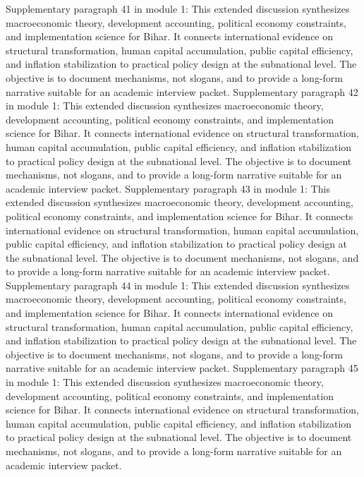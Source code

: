 \documentclass[preprint,12pt]{elsarticle}
\begin{document}
Supplementary paragraph 41 in module 1: This extended discussion synthesizes macroeconomic theory, development accounting, political economy constraints, and implementation science for Bihar. It connects international evidence on structural transformation, human capital accumulation, public capital efficiency, and inflation stabilization to practical policy design at the subnational level. The objective is to document mechanisms, not slogans, and to provide a long-form narrative suitable for an academic interview packet.
Supplementary paragraph 42 in module 1: This extended discussion synthesizes macroeconomic theory, development accounting, political economy constraints, and implementation science for Bihar. It connects international evidence on structural transformation, human capital accumulation, public capital efficiency, and inflation stabilization to practical policy design at the subnational level. The objective is to document mechanisms, not slogans, and to provide a long-form narrative suitable for an academic interview packet.
Supplementary paragraph 43 in module 1: This extended discussion synthesizes macroeconomic theory, development accounting, political economy constraints, and implementation science for Bihar. It connects international evidence on structural transformation, human capital accumulation, public capital efficiency, and inflation stabilization to practical policy design at the subnational level. The objective is to document mechanisms, not slogans, and to provide a long-form narrative suitable for an academic interview packet.
Supplementary paragraph 44 in module 1: This extended discussion synthesizes macroeconomic theory, development accounting, political economy constraints, and implementation science for Bihar. It connects international evidence on structural transformation, human capital accumulation, public capital efficiency, and inflation stabilization to practical policy design at the subnational level. The objective is to document mechanisms, not slogans, and to provide a long-form narrative suitable for an academic interview packet.
Supplementary paragraph 45 in module 1: This extended discussion synthesizes macroeconomic theory, development accounting, political economy constraints, and implementation science for Bihar. It connects international evidence on structural transformation, human capital accumulation, public capital efficiency, and inflation stabilization to practical policy design at the subnational level. The objective is to document mechanisms, not slogans, and to provide a long-form narrative suitable for an academic interview packet.
\end{document}
